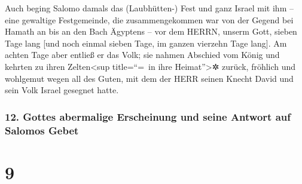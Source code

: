 Auch beging Salomo damals das (Laubhütten-) Fest und ganz
Israel mit ihm -- eine gewaltige Festgemeinde, die zusammengekommen war
von der Gegend bei Hamath an bis an den Bach Ägyptens -- vor dem HERRN,
unserm Gott, sieben Tage lang {[}und noch einmal sieben Tage, im ganzen
vierzehn Tage lang{]}. Am achten Tage aber entließ er das
Volk; sie nahmen Abschied vom König und kehrten zu ihren
Zelten\textless sup title=``=~in ihre Heimat''\textgreater✲ zurück,
fröhlich und wohlgemut wegen all des Guten, mit dem der HERR seinen
Knecht David und sein Volk Israel gesegnet hatte.

\hypertarget{gottes-abermalige-erscheinung-und-seine-antwort-auf-salomos-gebet}{%
\subsubsection{12. Gottes abermalige Erscheinung und seine Antwort auf
Salomos
Gebet}\label{gottes-abermalige-erscheinung-und-seine-antwort-auf-salomos-gebet}}

\hypertarget{section-8}{%
\section{9}\label{section-8}}

